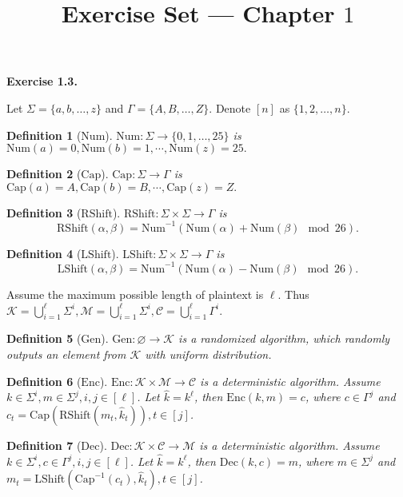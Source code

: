\documentclass[a4paper]{article}
\title{Exercise Set --- Chapter $1$}
\date{}
\newtheorem{definition}{Definition}
\newenvironment{exercise}[1]{
	\par
	\noindent\textbf{Exercise #1.}\quad
}{
	\par
	\bigskip
}
\begin{document}
\maketitle

\begin{exercise}{1.3}
    Let $\Sigma=\{a,b,\dots,z\}$ and $\Gamma=\{A,B,\dots,Z\}$.
    Denote $[n]$ as $\{1,2,\dots,n\}$.
    \begin{definition}[$\mathrm{Num}$]
        $\mathrm{Num}:\Sigma\to\{0,1,\dots,25\}$ is $\mathrm{Num}(a)=0,\mathrm{Num}(b)=1,\cdots,\mathrm{Num}(z)=25.$
    \end{definition}
    \begin{definition}[$\mathrm{Cap}$]
        $\mathrm{Cap}:\Sigma\to\Gamma$ is $\mathrm{Cap}(a)=A,\mathrm{Cap}(b)=B,\cdots,\mathrm{Cap}(z)=Z.$
    \end{definition}
    \begin{definition}[$\mathrm{RShift}$]
        $\mathrm{RShift}:\Sigma\times\Sigma\to\Gamma$ is
        $$
        \mathrm{RShift}(\alpha,\beta)=\mathrm{Num}^{-1}(\mathrm{Num}(\alpha)+\mathrm{Num}(\beta)\mod 26).
        $$
    \end{definition}
    \begin{definition}[$\mathrm{LShift}$]
        $\mathrm{LShift}:\Sigma\times\Sigma\to\Gamma$ is
        $$
        \mathrm{LShift}(\alpha,\beta)=\mathrm{Num}^{-1}(\mathrm{Num}(\alpha)-\mathrm{Num}(\beta)\mod 26).
        $$
    \end{definition}

    Assume the maximum possible length of plaintext is $\ell$.
    Thus $\mathcal K=\bigcup_{i=1}^\ell\Sigma^i,\mathcal M=\bigcup_{i=1}^\ell\Sigma^i,\mathcal C=\bigcup_{i=1}^\ell\Gamma^i$.
    \begin{definition}[$\mathrm{Gen}$]
        $\mathrm{Gen}:\varnothing\to\mathcal K$ is a randomized algorithm,
        which randomly outputs an element from $\mathcal K$ with uniform distribution.
    \end{definition}
    \begin{definition}[$\mathrm{Enc}$]
        $\mathrm{Enc}:\mathcal K\times\mathcal M\to\mathcal C$ is a deterministic algorithm.
        Assume $k\in\Sigma^i,m\in\Sigma^j,i,j\in[\ell]$. Let $\hat k=k^\ell$, then
        $\mathrm{Enc}(k,m)=c$, where $c\in\Gamma^j$ and $c_t=\mathrm{Cap}(\mathrm{RShift}(m_t,\hat k_t)),t\in[j]$.
    \end{definition}
    \begin{definition}[$\mathrm{Dec}$]
        $\mathrm{Dec}:\mathcal K\times\mathcal C\to\mathcal M$ is a deterministic algorithm.
        Assume $k\in\Sigma^i,c\in\Gamma^j,i,j\in[\ell]$. Let $\hat k=k^\ell$, then
        $\mathrm{Dec}(k,c)=m$, where $m\in\Sigma^j$ and $m_t=\mathrm{LShift}(\mathrm{Cap}^{-1}(c_t),\hat k_t),t\in[j]$.
    \end{definition}
\end{exercise}
\end{document}
